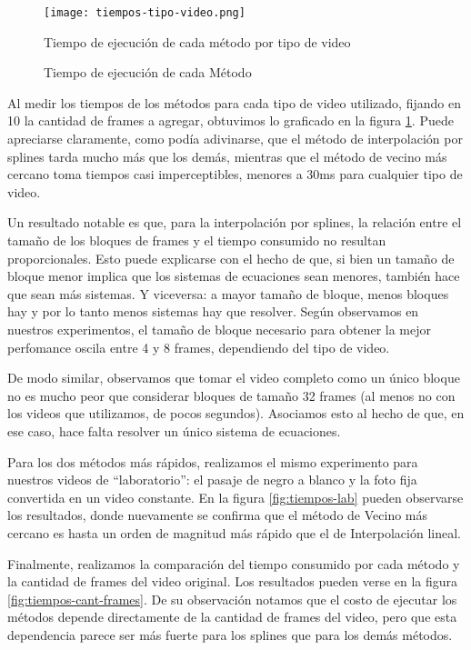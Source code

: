 \begin{figure}[h!]
  \centering
    \texttt{[image: tiempos-tipo-video.png]}
     \caption{Tiempo de ejecución de cada método por tipo de video}\label{fig:tiempos}
\end{figure}
\noindent


\begin{figure}[h!]
\centering
    \caption{Tiempo de ejecuci\'on de cada M\'etodo}
\end{figure}

Al medir los tiempos de los métodos para cada tipo de video utilizado, fijando en 10 la cantidad de frames a agregar, obtuvimos lo graficado en la figura \ref{fig:tiempos}. Puede apreciarse claramente, como podía adivinarse, que el método de interpolación por splines tarda mucho más que los demás, mientras que el método de vecino más cercano toma tiempos casi imperceptibles, menores a 30ms para cualquier tipo de video.

Un resultado notable es que, para la interpolación por splines, la relación entre el tamaño de los bloques de frames y el tiempo consumido no resultan proporcionales. Esto puede explicarse con el hecho de que, si bien un tamaño de bloque menor implica que los sistemas de ecuaciones sean menores, también hace que sean más sistemas. Y viceversa: a mayor tamaño de bloque, menos bloques hay y por lo tanto menos sistemas hay que resolver. Según observamos en nuestros experimentos, el tamaño de bloque necesario para obtener la mejor perfomance oscila entre 4 y 8 frames, dependiendo del tipo de video.

De modo similar, observamos que tomar el video completo como un único bloque no es mucho peor que considerar bloques de tamaño 32 frames (al menos no con los videos que utilizamos, de pocos segundos). Asociamos esto al hecho de que, en ese caso, hace falta resolver un único sistema de ecuaciones.

Para los dos métodos más rápidos, realizamos el mismo experimento para nuestros videos de ``laboratorio'': el pasaje de negro a blanco y la foto fija convertida en un video constante. En la figura \ref{fig:tiempos-lab} pueden observarse los resultados, donde nuevamente se confirma que el método de Vecino más cercano es hasta un orden de magnitud más rápido que el de Interpolación lineal.

Finalmente, realizamos la comparación del tiempo consumido por cada método y la cantidad de frames del video original. Los resultados pueden verse en la figura \ref{fig:tiempos-cant-frames}. De su observación notamos que el costo de ejecutar los métodos depende directamente de la cantidad de frames del video, pero que esta dependencia parece ser más fuerte para los splines que para los demás métodos.
